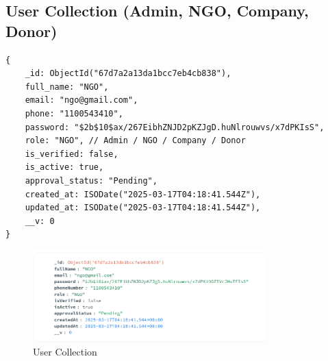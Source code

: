 \subsection{User Collection (Admin, NGO, Company, Donor)}
\begin{verbatim}
{
    _id: ObjectId("67d7a2a13da1bcc7eb4cb838"),
    full_name: "NGO",
    email: "ngo@gmail.com",
    phone: "1100543410",
    password: "$2b$10$ax/267EibhZNJD2pKZJgD.huNlrouwvs/x7dPKIsS",
    role: "NGO", // Admin / NGO / Company / Donor
    is_verified: false,
    is_active: true,
    approval_status: "Pending",
    created_at: ISODate("2025-03-17T04:18:41.544Z"),
    updated_at: ISODate("2025-03-17T04:18:41.544Z"),
    __v: 0
}

\end{verbatim}
\begin{figure}[h]
    \centering
    \includegraphics[width=0.8\textwidth]{images/user collection.png} %
    \caption{User Collection}
    \label{fig: User Collection}
\end{figure}

